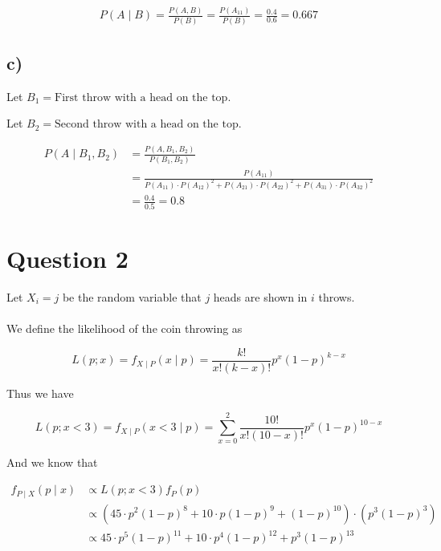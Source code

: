 \documentclass[12pt]{article}
\begin{document}
\begin{flushleft}
\vspace{-0.5cm}

\begin{align*}
P(A \mid B) = \frac{P(A, B)}{P(B)} = \frac{P(A_{11})}{P(B)} = \frac{0.4}{0.6}  = 0.667
\end{align*}

\subsection*{c)}


\qquad Let $B_{1} = \text{First throw with a head on the top.}$

\qquad Let $B_{2} = \text{Second throw with a head on the top.}$

\vspace{-0.5cm}

\begin{align*}
P(A\mid B_{1}, B_{2}) &= \frac{P(A, B_{1}, B_{2})}{P(B_{1}, B_{2})}\\
&= \frac{P(A_{11})}{P(A_{11}) \cdot P(A_{12})^2+ P(A_{21}) \cdot P(A_{22})^2 + P(A_{31}) \cdot P(A_{32})^2}\\
&= \frac{0.4}{0.5} = 0.8
\end{align*}

\newpage

\section{Question 2}

\qquad Let $X_i = j$ be the random variable that $j$ heads are shown in $i$ throws. \\

~\\

\qquad We define the likelihood of the coin throwing as

$$
L(p; x) = f_{X\mid P}(x\mid p) = \frac{k!}{x!(k-x)!}p^x(1-p)^{k-x}
$$

\qquad Thus we have

$$
L(p;x < 3) = f_{X\mid P}(x < 3\mid p) = \sum_{x=0}^2\frac{10!}{x!(10-x)!}p^x(1-p)^{10-x}
$$

\qquad And we know that 

\vspace{-0.5cm}

\begin{align*}
f_{P\mid X}(p\mid x)&\propto L(p; x<3) f_P(p)\\
&\propto (45\cdot p^2(1-p)^8 + 10\cdot p(1-p)^9 + (1-p)^{10}) \cdot (p^3(1-p)^3)\\
&\propto 45\cdot p^5(1-p)^{11} + 10\cdot p^4(1-p)^{12} + p^3(1-p)^{13}
\end{align*}


\end{flushleft}
\end{document}
